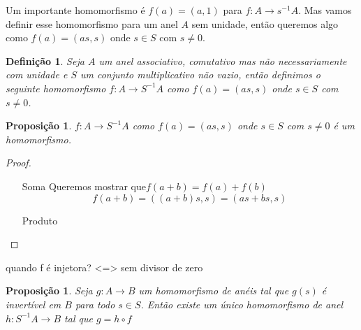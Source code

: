 \documentclass[10pt,a4paper]{article}
\newtheorem{proposition}[theorem]{Proposição}
\newtheorem{definition}[theorem]{Definição}
\begin{document}
Um importante homomorfismo é $f(a)=(a,1)$ para $f:A \rightarrow s^{-1}A$. Mas vamos definir esse homomorfismo para um anel $A$ sem unidade, então queremos algo como $f(a)=(as,s)$ onde $s \in S$ com $s \neq 0$.

\begin{definition}
	Seja $A$ um anel associativo, comutativo mas não necessariamente com unidade e $S$ um conjunto multiplicativo não vazio, então definimos o seguinte homomorfismo $f:A \rightarrow S^{-1}A$ como $f(a)=(as,s)$ onde $s \in S$ com $s \neq 0$.
\end{definition}

\begin{proposition}
	$f:A \rightarrow S^{-1}A$ como $f(a)=(as,s)$ onde $s \in S$ com $s \neq 0$ é um homomorfismo.
\end{proposition}
\begin{proof}
	\begin{enumerate}
		\item[Soma]Queremos mostrar que$f(a+b)=f(a)+f(b)$
		$$f(a+b)=((a+b)s,s)=(as+bs,s)$$
		\item[Produto]
	\end{enumerate}
\end{proof}

quando f é injetora? <=> sem divisor de zero

\begin{proposition} Seja $g:A \rightarrow B$ um homomorfismo de anéis tal que $g(s)$ é invertível em $B$ para todo $s \in S$. Então existe um único homomorfismo de anel $h:S^{-1}A \rightarrow B$ tal que $g = h\circ f$
\end{proposition}
\end{document}
